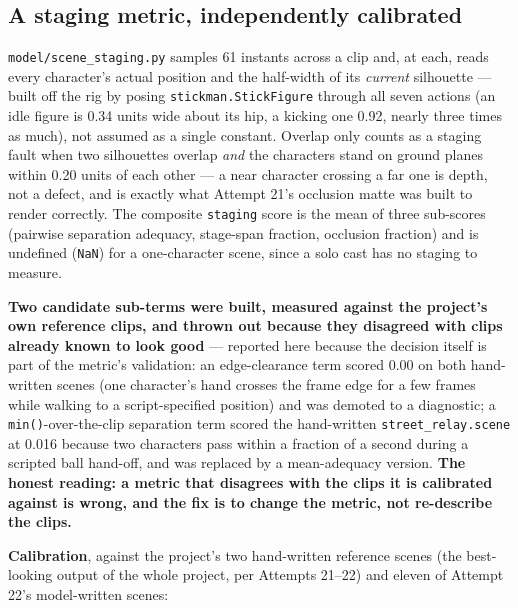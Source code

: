\documentclass[11pt]{article}
\begin{document}
\subsection{A staging metric, independently calibrated}
\label{sec:stagingmetric}

\texttt{model/scene\_staging.py} samples 61 instants across a clip and,
at each, reads every character's actual position and the half-width of
its \emph{current} silhouette --- built off the rig by posing
\texttt{stickman.StickFigure} through all seven actions (an idle figure
is 0.34 units wide about its hip, a kicking one 0.92, nearly three times
as much), not assumed as a single constant. Overlap only counts as a
staging fault when two silhouettes overlap \emph{and} the characters
stand on ground planes within 0.20 units of each other --- a near
character crossing a far one is depth, not a defect, and is exactly what
Attempt 21's occlusion matte was built to render correctly. The composite
\texttt{staging} score is the mean of three sub-scores (pairwise
separation adequacy, stage-span fraction, occlusion fraction) and is
undefined (\texttt{NaN}) for a one-character scene, since a solo cast has
no staging to measure.

\textbf{Two candidate sub-terms were built, measured against the
project's own reference clips, and thrown out because they disagreed
with clips already known to look good} --- reported here because the
decision itself is part of the metric's validation: an edge-clearance
term scored 0.00 on both hand-written scenes (one character's hand
crosses the frame edge for a few frames while walking to a
script-specified position) and was demoted to a diagnostic; a
\texttt{min()}-over-the-clip separation term scored the hand-written
\texttt{street\_relay.scene} at 0.016 because two characters pass within
a fraction of a second during a scripted ball hand-off, and was replaced
by a mean-adequacy version. \textbf{The honest reading: a metric that
disagrees with the clips it is calibrated against is wrong, and the fix
is to change the metric, not re-describe the clips.}

\textbf{Calibration}, against the project's two hand-written reference
scenes (the best-looking output of the whole project, per Attempts
21--22) and eleven of Attempt 22's model-written scenes:
\end{document}
